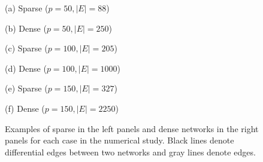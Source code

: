 \documentclass[useAMS,usenatbib,referee]{bio}
\begin{document}
{{\begin{figure}[htb!] %
\begin{center} \medskip
\begin{minipage}[b]{.45\linewidth}
  \centering   \centerline{}
  \centerline{(a) Sparse ($p=50, |E| = 88$)} \medskip
  \end{minipage} \medskip
\begin{minipage}[b]{.45\linewidth}
  \centering   \centerline{}
  \centerline{(b) Dense ($p=50, |E| = 250$) } \medskip
\end{minipage}
\begin{minipage}[b]{.45\linewidth}
  \centering   \centerline{}
  \centerline{(c) Sparse ($p=100, |E| = 205$)} \medskip
\end{minipage}
\begin{minipage}[b]{.45\linewidth}
  \centering   \centerline{}
  \centerline{(d) Dense  ($p=100, |E| = 1000$)} \medskip
\end{minipage}
\begin{minipage}[b]{.45\linewidth}
  \centering   \centerline{}
  \centerline{(e) Sparse ($p=150, |E| = 327$) } \medskip
\end{minipage}
\begin{minipage}[b]{.45\linewidth}
  \centering   \centerline{}
  \centerline{(f) Dense  ($p=150, |E| = 2250$)} \medskip
\end{minipage}
\caption{Examples of sparse in the left panels and dense networks 
in the right panels for each case in the numerical study.
Black lines denote differential edges between two networks and 
gray lines denote edges.}
\end{center}
\end{figure}


}}
\end{document}
